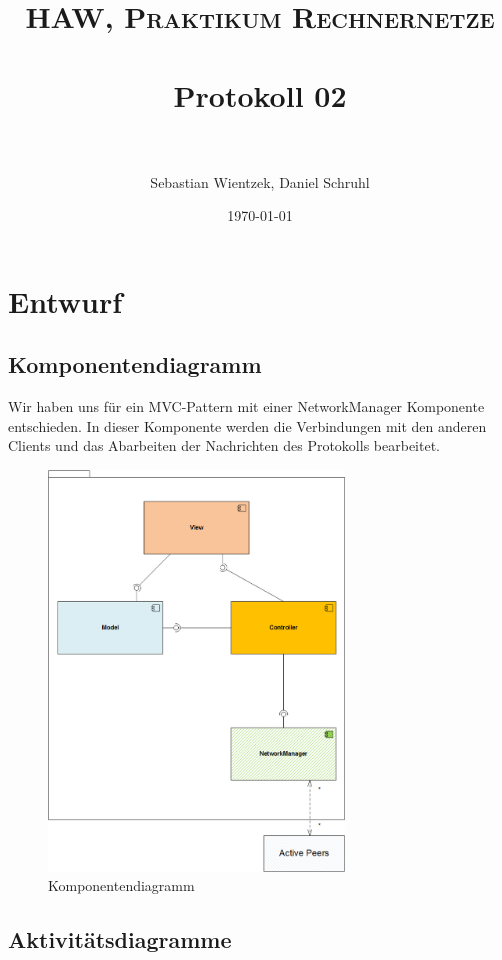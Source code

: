 \documentclass[paper=a4, fontsize=11pt]{scrreprt}
\title{	
	\normalfont \normalsize 
	\textsc{HAW, Praktikum Rechnernetze} \\ [25pt] 
	\horrule{0.5pt} \\[0.4cm]
	\huge Protokoll 02 \\
	\horrule{2pt} \\[0.5cm]
}
\author{Sebastian Wientzek, Daniel Schruhl}
\date{\normalsize\today}
\numberwithin{equation}{section}
\numberwithin{figure}{section}
\numberwithin{table}{section}
\begin{document}
\maketitle

\section{Entwurf}

\subsection{Komponentendiagramm}

Wir haben uns für ein MVC-Pattern mit einer NetworkManager Komponente entschieden. In dieser Komponente werden die Verbindungen mit den anderen Clients und das Abarbeiten der Nachrichten des Protokolls bearbeitet.

\begin{figure}[!htb] 
  \centering
     \includegraphics[width=0.7\textwidth]{resources/component-diagram.png}
  \caption{Komponentendiagramm}
  \label{fig:component-diagram}
\end{figure}

\newpage

\subsection{Aktivitätsdiagramme}
\end{document}

